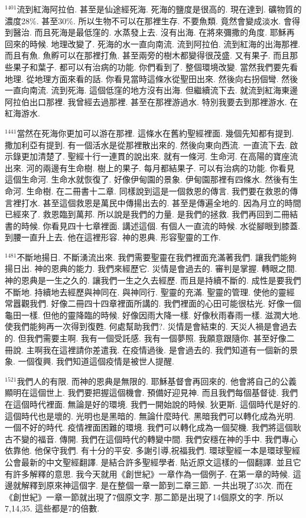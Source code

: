 \documentclass{book}
\begin{document}
$^{1401}$流到紅海阿拉伯.
甚至是仙途經死海.
死海的鹽度是很高的.
現在達到.
礦物質的濃度28\%.
甚至30\%.
所以生物不可以在那裡生存.
不要魚類.
竟然會變成淡水.
會得到醫治.
而且死海是最低窪的.
水蒸發上去.
沒有出海.
在將來彌撒的角度.
耶穌再回來的時候.
地理改變了.
死海的水一直向南流.
流到阿拉伯.
流到紅海的出海那裡.
而且有魚.
魚孵可以在那裡打魚.
甚至兩旁的樹木都變得很茂盛.
又有果子.
而且那些果子和葉子.
都可以有治病的功能.
你們看到了.
整個環境改變.
當然我們要先看地理.
從地理方面來看的話.
你看見當時這條水從聖田出來.
然後向右拐個彎.
然後一直向南流.
流到死海.
這個低窪的地方沒有出海.
但繼續流下去.
就流到紅海東邊阿拉伯出口那裡.
我曾經去過那裡.
甚至在那裡游過水.
特別我要去到那裡游水.
在紅海游水.

$^{1441}$當然在死海你更加可以游在那裡.
這條水在舊約聖經裡面.
幾個先知都有提到.
撒加利亞有提到.
有一個活水是從那裡散出來的.
然後向東向西流.
一直流下去.
啟示錄更加清楚了.
聖經十行一連貫的說出來.
就有一條河.
生命河.
在高陽的寶座流出來.
河的兩邊有生命樹.
樹上的果子.
每月都結果子.
可以有治病的功能.
你看見這個生命河.
生命水就恢復了.
好像伊甸園的景象.
伊甸園那裡有四條水.
然後有生命河.
生命樹.
在二冊書十二章.
同樣說到這是一個救恩的傳言.
我們要在救恩的傳言裡打水.
甚至這個救恩是萬民中傳揚出去的.
甚至是傳遍全地的.
因為月立的時間已經來了.
救恩臨到萬邦.
所以說是我們的力量.
是我們的拯救.
我們再回到二冊結書的時候.
你看見四十七章裡面.
講述這個.
有個人一直流的時候.
水從腳眼到膝蓋.
到腰一直升上去.
他在這裡形容.
神的恩典.
形容聖靈的工作.

$^{1481}$不斷地揚日.
不斷湧流出來.
我們需要聖靈在我們裡面充滿著我們.
讓我們能夠揚日出.
神的恩典的能力.
我們來經歷它.
災情是會過去的.
審判是掌握.
轉眼之間.
神的恩典是一生之久的.
讓我們一生之久去經歷.
而且是持續不斷的.
成性是要我們不斷地.
持續地去經歷與神同在.
與神同行.
聖靈的充滿.
聖靈的管理.
使他的靈經常囂觀我們.
好像二冊四十四章裡面所講的.
我們裡面的心田可能很枯光.
好像一個龜田一樣.
但他的靈降臨的時候.
好像因雨大降一樣.
好像秋雨春雨一樣.
滋潤大地.
使我們能夠再一次得到復甦.
何處幫助我們?.
災情是會結束的.
天災人禍是會過去的.
但我們需要主啊.
我有一個受託感.
我有一個夢照.
我願意跟隨你.
甚至好像二冊說.
主啊我在這裡請你差遣我.
在疫情過後.
是會過去的.
我們知道有一個新的景象.
一個復興.
我們知道這個疫情是被世人提醒.

$^{1521}$我們人的有限.
而神的恩典是無限的.
耶穌基督會再回來的.
他會將自己的公義顯明在這個世上.
我們要把握這個機會.
預備好迎見神.
而且我們每個基督徒.
我們在這個時代裡面.
無論是好的環境.
我們一開始說的時候.
狄更斯.
這個時代是好的.
這個時代也是壞的.
光明也是黑暗的.
無論什麼時代.
黑暗我們可以轉化成為光明.
一個不好的時代.
疫情裡面困難的環境.
我們可以轉化成為一個契機.
我們將這個耿古不變的福音.
傳開.
我們在這個時代的轉變中間.
我們安穩在神的手中.
我們專心依靠他.
他保守我們.
有十分的平安.
多謝引導,祝福我們.
環球聖經一本是環球聖經公會最新的中文聖經翻譯.
是結合許多聖經學者.
貼近原文這樣的一個翻譯.
並且它有許多解釋的意思.
我今天就用《創世紀》一章作為一個例子.
在第一章的時候.
這邊就解釋到原來神這個字.
是在整個一章一節到二章三節.
一共出現了35次.
而在《創世紀》一章一節就出現了7個原文字.
那二節是出現了14個原文的字.
所以7,14,35.
這些都是7的倍數.
\end{document}
